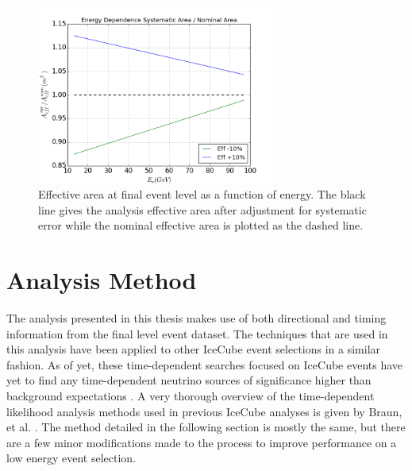 \documentclass{gatech-thesis}
\begin{document}
\begin{figure}[ht]
  \begin{center}
    \includegraphics[width=0.7\textwidth,keepaspectratio]{GENIE_EffectiveAreaRatioTrend_DomEff.png}
  \end{center}
  \caption{Effective area at final event level as a function of energy. The black line gives the analysis effective area after adjustment for systematic error while the nominal effective area is plotted as the dashed line.}
  \label{fig:SysAreaWithNom}
\end{figure}

\chapter{Analysis Method}

The analysis presented in this thesis makes use of both directional and timing information from the final level event dataset. The techniques that are used in this analysis have been applied to other IceCube event selections in a similar fashion. As of yet, these time-dependent searches focused on IceCube events have yet to find any time-dependent neutrino sources of significance higher than background expectations \cite{2012ApJ...744....1A}. A very thorough overview of the time-dependent likelihood analysis methods used in previous IceCube analyses is given by Braun, et al. \cite{2010APh....33..175B}. The method detailed in the following section is mostly the same, but there are a few minor modifications made to the process to improve performance on a low energy event selection.
\end{document}
